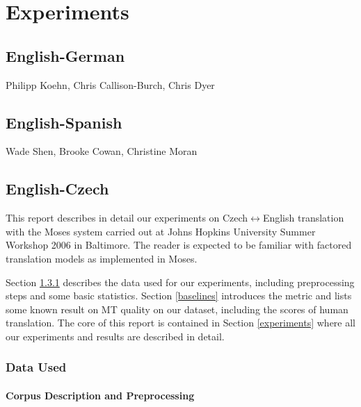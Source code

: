 \documentclass[11pt]{book}
\theoremstyle{plain}
\begin{document}

\chapter{Experiments}

\section{English-German}
{\sc Philipp Koehn, Chris Callison-Burch, Chris Dyer}
\section{English-Spanish}
{\sc Wade Shen, Brooke Cowan, Christine Moran}

\section{English-Czech}

\def\bidir{Czech$\leftrightarrow$English}
\def\tocs{English$\rightarrow$Czech}
\def\toen{Czech$\rightarrow$English}
\def\parcite#1{\cite{#1}}
\def\perscite#1{\newcite{#1}}

\def\max#1{{\bf{} #1}}
\def\stddev#1{{$\pm$#1}}

This report describes in detail our experiments on \bidir{} translation
with the Moses system \parcite{moses} carried out at Johns Hopkins University
Summer Workshop 2006 in Baltimore. The reader is expected to be
familiar with factored translation models as implemented in Moses.

Section \ref{data} describes the data used for our experiments, including
preprocessing steps and some basic statistics. Section \ref{baselines}
introduces the metric and lists some known result on MT quality on our
dataset, including the scores of human translation. The core of this report is
contained in Section \ref{experiments} where all our experiments and results are
described in detail.




\subsection{Data Used}
\label{data}




\subsubsection{Corpus Description and Preprocessing}
\label{tools}
\end{document}
